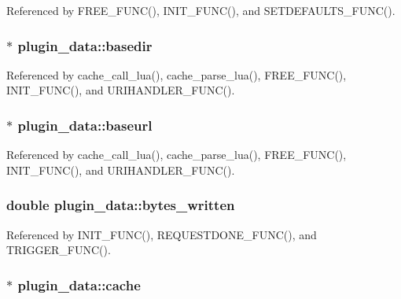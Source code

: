Referenced by F\-R\-E\-E\-\_\-\-F\-U\-N\-C(), I\-N\-I\-T\-\_\-\-F\-U\-N\-C(), and S\-E\-T\-D\-E\-F\-A\-U\-L\-T\-S\-\_\-\-F\-U\-N\-C().

\hypertarget{structplugin__data_a62fb99b4e8e39a7527d4f11bc884a569}{
\subsubsection[{basedir}]{$\ast$ plugin\-\_\-data\-::basedir}}\label{structplugin__data_a62fb99b4e8e39a7527d4f11bc884a569}


Referenced by cache\-\_\-call\-\_\-lua(), cache\-\_\-parse\-\_\-lua(), F\-R\-E\-E\-\_\-\-F\-U\-N\-C(), I\-N\-I\-T\-\_\-\-F\-U\-N\-C(), and U\-R\-I\-H\-A\-N\-D\-L\-E\-R\-\_\-\-F\-U\-N\-C().

\hypertarget{structplugin__data_a694a4f05a34acf406676f4c14773181b}{
\subsubsection[{baseurl}]{$\ast$ plugin\-\_\-data\-::baseurl}}\label{structplugin__data_a694a4f05a34acf406676f4c14773181b}


Referenced by cache\-\_\-call\-\_\-lua(), cache\-\_\-parse\-\_\-lua(), F\-R\-E\-E\-\_\-\-F\-U\-N\-C(), I\-N\-I\-T\-\_\-\-F\-U\-N\-C(), and U\-R\-I\-H\-A\-N\-D\-L\-E\-R\-\_\-\-F\-U\-N\-C().

\hypertarget{structplugin__data_aae9be64c141237a5a96faef643064c26}{
\subsubsection[{bytes\-\_\-written}]{\setlength{\rightskip}{0pt plus 5cm}double plugin\-\_\-data\-::bytes\-\_\-written}}\label{structplugin__data_aae9be64c141237a5a96faef643064c26}


Referenced by I\-N\-I\-T\-\_\-\-F\-U\-N\-C(), R\-E\-Q\-U\-E\-S\-T\-D\-O\-N\-E\-\_\-\-F\-U\-N\-C(), and T\-R\-I\-G\-G\-E\-R\-\_\-\-F\-U\-N\-C().

\hypertarget{structplugin__data_aeab3f4d61ec1bbf2afe8576af7ca1982}{
\subsubsection[{cache}]{$\ast$ plugin\-\_\-data\-::cache}}\label{structplugin__data_aeab3f4d61ec1bbf2afe8576af7ca1982}


